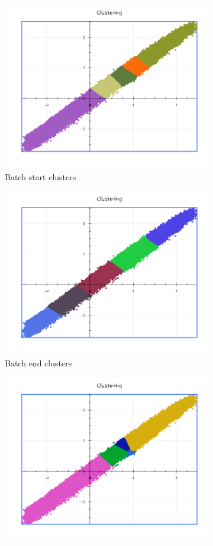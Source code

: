 \documentclass{lmproj}
\begin{document}
\begin{figure}[H]
	\begin{subfigure}{.5\textwidth}
		\centering
		\includegraphics[width=.8\linewidth]{cluster_visualization/batch_50_50_k_5_start}
		\caption*{Batch start clusters}
		\label{fig:batch_50_50_k_5_start}
	\end{subfigure}%
	\begin{subfigure}{.5\textwidth}
		\centering
		\includegraphics[width=.8\linewidth]{cluster_visualization/batch_50_50_k_5_end}
		\caption*{Batch end clusters}
		\label{fig:batch_50_50_k_5_end}
	\end{subfigure}
	\begin{subfigure}{.5\textwidth}
		\centering
		\includegraphics[width=.8\linewidth]{cluster_visualization/local_50_50_k_5_start}

\end{subfigure}
\end{figure}
\end{document}
